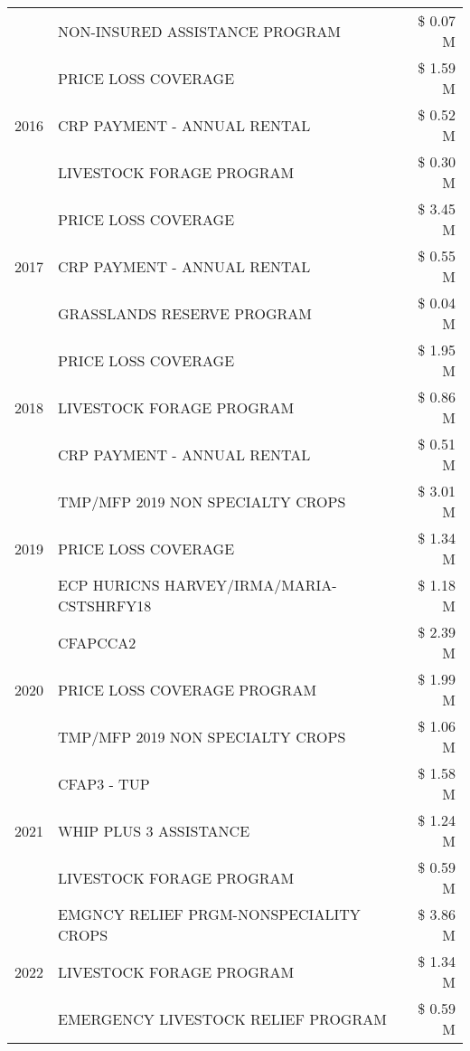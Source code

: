 \begin{tabular}{llr}
 & NON-INSURED ASSISTANCE PROGRAM & \$ 0.07 M \\
\cline{1-3}
\multirow[t]{3}{*}{2016} & PRICE LOSS COVERAGE & \$ 1.59 M \\
 & CRP PAYMENT - ANNUAL RENTAL & \$ 0.52 M \\
 & LIVESTOCK FORAGE PROGRAM & \$ 0.30 M \\
\cline{1-3}
\multirow[t]{3}{*}{2017} & PRICE LOSS COVERAGE & \$ 3.45 M \\
 & CRP PAYMENT - ANNUAL RENTAL & \$ 0.55 M \\
 & GRASSLANDS RESERVE PROGRAM & \$ 0.04 M \\
\cline{1-3}
\multirow[t]{3}{*}{2018} & PRICE LOSS COVERAGE & \$ 1.95 M \\
 & LIVESTOCK FORAGE PROGRAM & \$ 0.86 M \\
 & CRP PAYMENT - ANNUAL RENTAL & \$ 0.51 M \\
\cline{1-3}
\multirow[t]{3}{*}{2019} & TMP/MFP 2019 NON SPECIALTY CROPS & \$ 3.01 M \\
 & PRICE LOSS COVERAGE & \$ 1.34 M \\
 & ECP HURICNS HARVEY/IRMA/MARIA-CSTSHRFY18 & \$ 1.18 M \\
\cline{1-3}
\multirow[t]{3}{*}{2020} & CFAPCCA2 & \$ 2.39 M \\
 & PRICE LOSS COVERAGE PROGRAM & \$ 1.99 M \\
 & TMP/MFP 2019 NON SPECIALTY CROPS & \$ 1.06 M \\
\cline{1-3}
\multirow[t]{3}{*}{2021} & CFAP3 - TUP & \$ 1.58 M \\
 & WHIP PLUS 3 ASSISTANCE & \$ 1.24 M \\
 & LIVESTOCK FORAGE PROGRAM & \$ 0.59 M \\
\cline{1-3}
\multirow[t]{3}{*}{2022} & EMGNCY RELIEF PRGM-NONSPECIALITY CROPS & \$ 3.86 M \\
 & LIVESTOCK FORAGE PROGRAM & \$ 1.34 M \\
 & EMERGENCY LIVESTOCK RELIEF PROGRAM & \$ 0.59 M \\
\cline{1-3}
\bottomrule
\end{tabular}
